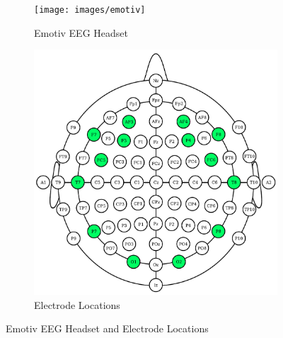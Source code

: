 \documentclass[12pt]{article}
\numberwithin{equation}{section}
\numberwithin{figure}{section}
\numberwithin{table}{section}
\begin{document}
\par{
    \begin{figure}
        \centering
        \begin{subfigure}{.45\textwidth}
            \vspace*{2.55cm}
            \texttt{[image: images/emotiv]}
            \caption{Emotiv EEG Headset}
            \label{fig:emotiv_eeg_headset}
        \end{subfigure}%
        \begin{subfigure}{.55\textwidth}
            \centering
            \includegraphics[scale=.4]{images/10_20_emotiv}
            \caption{Electrode Locations}
            \label{fig:emotiv_eeg_1020}
        \end{subfigure}
        \caption{Emotiv EEG Headset and Electrode Locations}
        \label{fig:emotiv_eeg_headset_locations}
    \end{figure}

}
\end{document}
